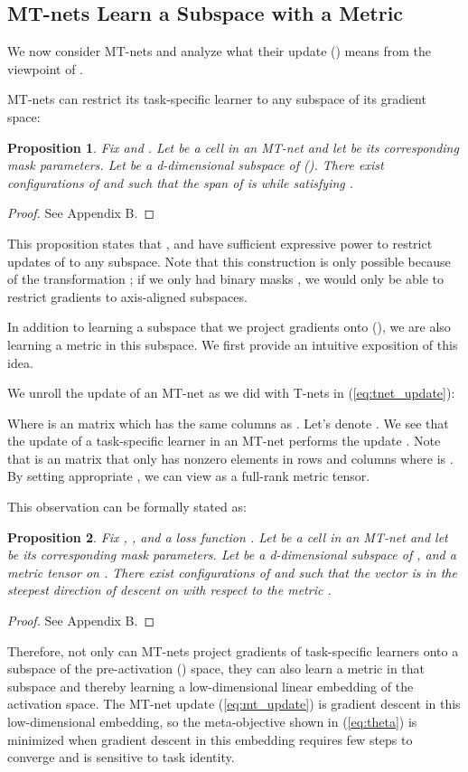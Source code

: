 \documentclass{article}
\newtheorem{prop}{Proposition}
\newcommand{\0}{{\bf 0}}
\begin{document}
\subsection{MT-nets Learn a Subspace with a Metric}
\label{subsec:mtnet_analysis}
We now consider MT-nets and analyze what their update () means from the viewpoint of .

MT-nets can restrict its task-specific learner to any subspace of its gradient space:

\begin{prop}
\label{prop}
Fix  and . 
Let  be a cell in an MT-net and let  be its corresponding mask parameters.
Let  be a d-dimensional subspace of  ().
There exist configurations of  and  such that the span of  is  while satisfying .
\end{prop}

\begin{proof}
See Appendix B.
\end{proof}

This proposition states that , and  have sufficient expressive power to restrict updates of  to any subspace.
Note that this construction is only possible because of the transformation ; if we only had binary masks , we would only be able to restrict gradients to axis-aligned subspaces.

In addition to learning a subspace that we project gradients onto (), we are also learning a metric in this subspace.
We first provide an intuitive exposition of this idea.

We unroll the update of an MT-net as we did with T-nets in (\ref{eq:tnet_update}):


Where  is an  matrix which has the same columns as .
Let's denote .
We see that the update of a task-specific learner in an MT-net performs the update .
Note that  is an  matrix that only has nonzero elements in rows and columns where  is .
By setting appropriate , we can view  as a full-rank  metric tensor.

This observation can be formally stated as:
\begin{prop}
\label{prop2}
Fix , , and a loss function .
Let  be a cell in an MT-net and let  be its corresponding mask parameters.
Let  be a d-dimensional subspace of , and  a metric tensor on .
There exist configurations of  and  such that the vector  is in 
the steepest direction of descent on  with respect to the metric .
\end{prop}

\begin{proof}
See Appendix B.
\end{proof}
Therefore, not only can MT-nets project gradients of task-specific learners onto a subspace of the pre-activation () space,
they can also learn a metric in that subspace and thereby learning a low-dimensional linear embedding of the activation space.
The MT-net update (\ref{eq:mt_update}) is gradient descent in this low-dimensional embedding,
so the meta-objective shown in (\ref{eq:theta}) is minimized when gradient descent in this embedding requires few steps to converge and is sensitive to task identity.
\end{document}
